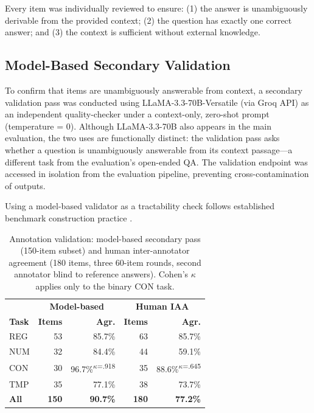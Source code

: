 Every item was individually reviewed to ensure: (1) the answer is unambiguously derivable from the provided context; (2) the question has exactly one correct answer; and (3) the context is sufficient without external knowledge.

\subsection{Model-Based Secondary Validation}

To confirm that items are unambiguously answerable from context, a secondary validation pass was conducted using LLaMA-3.3-70B-Versatile (via Groq API) as an independent quality-checker under a context-only, zero-shot prompt (temperature = 0). Although LLaMA-3.3-70B also appears in the main evaluation, the two uses are functionally distinct: the validation pass asks whether a question is unambiguously answerable from its context passage---a different task from the evaluation's open-ended QA. The validation endpoint was accessed in isolation from the evaluation pipeline, preventing cross-contamination of outputs.

Using a model-based validator as a tractability check follows established benchmark construction practice \citep{islam2023financebench, hendrycks2021cuad}.

\begin{table}[t]
\centering\small
\begin{tabular}{lrrrr}
\toprule
 & \multicolumn{2}{c}{\textbf{Model-based}} & \multicolumn{2}{c}{\textbf{Human IAA}} \\
\textbf{Task} & \textbf{Items} & \textbf{Agr.} & \textbf{Items} & \textbf{Agr.} \\
\midrule
REG & 53 & 85.7\% & 63 & 85.7\% \\
NUM & 32 & 84.4\% & 44 & 59.1\% \\
CON & 30 & 96.7\%\textsuperscript{$\kappa$=.918} & 35 & 88.6\%\textsuperscript{$\kappa$=.645} \\
TMP & 35 & 77.1\% & 38 & 73.7\% \\
\midrule
\textbf{All} & \textbf{150} & \textbf{90.7\%} & \textbf{180} & \textbf{77.2\%} \\
\bottomrule
\end{tabular}
\caption{Annotation validation: model-based secondary pass (150-item subset) and human inter-annotator agreement (180 items, three 60-item rounds, second annotator blind to reference answers). Cohen's $\kappa$ applies only to the binary CON task.}
\label{tab:validation}
\end{table}

